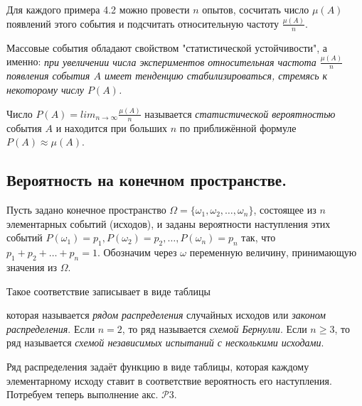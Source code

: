 Для каждого примера 4.2 можно провести $n$ опытов, сосчитать число $\mu(A)$ появлений этого события и подсчитать относительную частоту $\frac{\mu(A)}{n}$.

Массовые события обладают свойством "статистической устойчивости", а именно: \textit{при увеличении числа экспериментов относительная частота $\frac{\mu(A)}{n}$
появления события $A$ имеет тенденцию стабилизироваться, стремясь к некоторому числу $P(A)$.}
\begin{definition}
Число $P(A) = lim_{n\to\infty} \frac{\mu(A)}{n}$ называется \textit{статистической вероятностью} события $A$ и находится при больших $n$ по приближённой формуле $P(A)\approx \mu(A)$.
\end{definition} 

\subsection{Вероятность на конечном пространстве.}
Пусть задано конечное пространство $\Omega=\{\omega_1,\omega_2,\ldots,\omega_n\}$, состоящее из $n$ элементарных событий (исходов), и заданы вероятности наступления этих
событий $P(\omega_1 ) = p_1 , P(\omega_2 ) = p_2 , \ldots , P(\omega_n ) = p_n$ так, что $p_1 + p_2 + \ldots + p_n = 1$.
Обозначим через $\omega$ переменную величину, принимающую значения из $\Omega$.

\begin{definition}
	Такое соответствие записывает в виде таблицы
\begin{table}
\end{table}

которая называется \textit{рядом распределения} случайных исходов или \textit{законом
распределения}. Если $n = 2$, то ряд называется \textit{схемой Бернулли}. Если $n \geq 3$,
то ряд называется \textit{схемой независимых испытаний с несколькими исходами}.
\end{definition}

Ряд распределения задаёт функцию в виде таблицы, которая каждому элементарному исходу ставит в соответствие вероятность его наступления.
Потребуем теперь выполнение акс. $\mathcal{P}3$.


